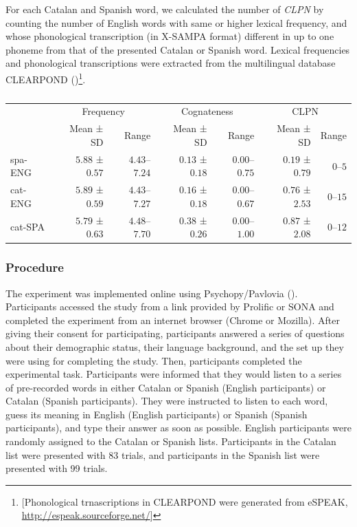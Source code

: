 \documentclass[
]{article}
\begin{document}
For each Catalan and Spanish word, we calculated the number of
\emph{CLPN} by counting the number of English words with same or higher
lexical frequency, and whose phonological transcription (in X-SAMPA
format) different in up to one phoneme from that of the presented
Catalan or Spanish word. Lexical frequencies and phonological
transcriptions were extracted from the multilingual database CLEARPOND
()\footnote{{[}Phonological
  trnascriptions in CLEARPOND were generated from eSPEAK,
  \url{http://espeak.sourceforge.net/}{]}}.

\captionsetup{labelsep=none}

\begin{longtable}{l|rrrrrr}

\caption{\label{tbl-stimuli}}

\tabularnewline

\toprule
\multicolumn{1}{l}{} & \multicolumn{2}{c}{Frequency} & \multicolumn{2}{c}{Cognateness} & \multicolumn{2}{c}{CLPN} \\ 
\cmidrule(lr){2-3} \cmidrule(lr){4-5} \cmidrule(lr){6-7}
\multicolumn{1}{l}{} & Mean ± SD & Range & Mean ± SD & Range & Mean ± SD & Range \\ 
\midrule\addlinespace[2.5pt]
spa-ENG & $5.88$ ± $0.57$ & $4.43$–$7.24$ & $0.13$ ± $0.18$ & $0.00$–$0.75$ & $0.19$ ± $0.79$ & $0$–$5$ \\ 
cat-ENG & $5.89$ ± $0.59$ & $4.43$–$7.27$ & $0.16$ ± $0.18$ & $0.00$–$0.67$ & $0.76$ ± $2.53$ & $0$–$15$ \\ 
cat-SPA & $5.79$ ± $0.63$ & $4.48$–$7.70$ & $0.38$ ± $0.26$ & $0.00$–$1.00$ & $0.87$ ± $2.08$ & $0$–$12$ \\ 
\bottomrule

\end{longtable}

\subsubsection{Procedure}\label{procedure}

The experiment was implemented online using Psychopy/Pavlovia
(). Participants
accessed the study from a link provided by Prolific or SONA and
completed the experiment from an internet browser (Chrome or Mozilla).
After giving their consent for participating, participants answered a
series of questions about their demographic status, their language
background, and the set up they were using for completing the study.
Then, participants completed the experimental task. Participants were
informed that they would listen to a series of pre-recorded words in
either Catalan or Spanish (English participants) or Catalan (Spanish
participants). They were instructed to listen to each word, guess its
meaning in English (English participants) or Spanish (Spanish
participants), and type their answer as soon as possible. English
participants were randomly assigned to the Catalan or Spanish lists.
Participants in the Catalan list were presented with 83 trials, and
participants in the Spanish list were presented with 99 trials.
\end{document}
